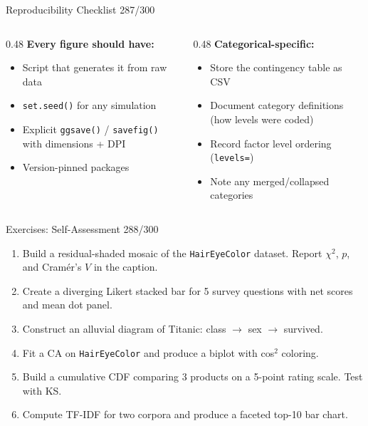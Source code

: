 \documentclass[10pt]{beamer}
\newcommand{\smark}[1]{\hfill{\scriptsize\color{codegray}#1}}
\begin{document}
\begin{frame}{Reproducibility Checklist}
\smark{287/300}
\begin{columns}[T]
\begin{column}{0.48\textwidth}
    \textbf{Every figure should have:}
    \begin{itemize}
        \item Script that generates it from raw data
        \item \texttt{set.seed()} for any simulation
        \item Explicit \texttt{ggsave()} / \texttt{savefig()} with dimensions + DPI
        \item Version-pinned packages
    \end{itemize}
\end{column}
\begin{column}{0.48\textwidth}
    \textbf{Categorical-specific:}
    \begin{itemize}
        \item Store the contingency table as CSV
        \item Document category definitions (how levels were coded)
        \item Record factor level ordering (\texttt{levels=})
        \item Note any merged/collapsed categories
    \end{itemize}
\end{column}
\end{columns}
\end{frame}

\begin{frame}{Exercises: Self-Assessment}
\smark{288/300}
\begin{enumerate}
    \item Build a residual-shaded mosaic of the \texttt{HairEyeColor} dataset. Report $\chi^2$, $p$, and Cram\'er's $V$ in the caption.
    \item Create a diverging Likert stacked bar for 5 survey questions with net scores and mean dot panel.
    \item Construct an alluvial diagram of Titanic: class $\to$ sex $\to$ survived.
    \item Fit a CA on \texttt{HairEyeColor} and produce a biplot with cos$^2$ coloring.
    \item Build a cumulative CDF comparing 3 products on a 5-point rating scale. Test with KS.
    \item Compute TF-IDF for two corpora and produce a faceted top-10 bar chart.
\end{enumerate}
\end{frame}
\end{document}

